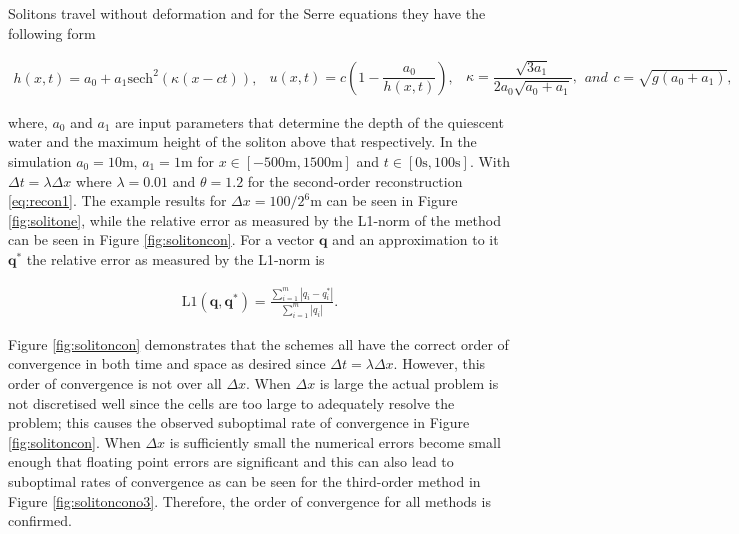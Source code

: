 \documentclass[SingleSpace,12pt]{Serre_ASCE}
\begin{document}
Solitons travel without deformation and for the Serre equations they have the following form
\begin{linenomath*}
\begin{subequations}
\begin{gather}\label{eq:sol1}
h\left(x,t\right) = a_0 + a_1\text{sech}^2\left( \kappa\left(x - ct\right)\right),
\end{gather}
\begin{gather}\label{eq:sol2}
u\left(x,t\right) = c\left(1 - \dfrac{a_0}{h(x,t)} \right),
\end{gather}
\begin{gather}\label{eq:sol3}
\kappa = \dfrac{\sqrt{3a_1}}{2a_0 \sqrt{ a_0 + a_1}},
\end{gather}
and
\begin{gather}\label{eq:sol4}
c = \sqrt{g \left(a_0 + a_1\right)},
\end{gather}
\end{subequations}
\label{eq:sol}
\end{linenomath*}
where, $a_0$ and $a_1$ are input parameters that determine the depth of the quiescent water and the maximum height of the soliton above that respectively. In the simulation $a_0 = 10\text{m}$, $a_1 = 1\text{m}$ for $x\in\left[-500\text{m},1500\text{m}\right]$ and $t\in\left[0\text{s},100\text{s}\right]$. With $\Delta t = \lambda \Delta x$ where $\lambda = 0.01$ and $\theta = 1.2$ for the second-order reconstruction \eqref{eq:recon1}. The example results for $\Delta x = 100 /2^{6}\text{m}$ can be seen in Figure \ref{fig:solitone}, while the relative error as measured by the L1-norm of the method can be seen in Figure \ref{fig:solitoncon}. For a vector $\boldsymbol{q}$ and an approximation to it $\boldsymbol{q}^*$ the relative error as measured by the L1-norm is
\begin{linenomath*}
\begin{gather}
\text{L1}\left(\boldsymbol{q},\boldsymbol{q}^*\right) = \frac{\sum_{i=1}^{m} |q_i - q^*_i|}{\sum_{i=1}^{m} |q_i|}.
\end{gather}
\end{linenomath*}

Figure \ref{fig:solitoncon} demonstrates that the schemes all have the correct order of convergence in both time and space as desired since $\Delta t = \lambda \Delta x$. However, this order of convergence is not over all $\Delta x$. When $\Delta x$ is large the actual problem is not discretised well since the cells are too large to adequately resolve the problem; this causes the observed suboptimal rate of convergence in Figure \ref{fig:solitoncon}. When $\Delta x$ is sufficiently small the numerical errors become small enough that floating point errors are significant and this can also lead to suboptimal rates of convergence as can be seen for the third-order method in Figure \ref{fig:solitoncono3}. Therefore, the order of convergence for all methods is confirmed.
\end{document}
